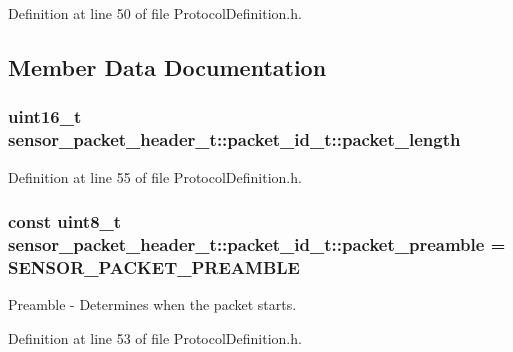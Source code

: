 \-Definition at line 50 of file \-Protocol\-Definition.\-h.



\subsection{\-Member \-Data \-Documentation}
\hypertarget{structsensor__packet__header__t_1_1packet__id__t_a3ece38a344ef1b83c673d7e2e0b83f6f}{
\subsubsection[{packet\-\_\-length}]{\setlength{\rightskip}{0pt plus 5cm}uint16\-\_\-t {\bf sensor\-\_\-packet\-\_\-header\-\_\-t\-::packet\-\_\-id\-\_\-t\-::packet\-\_\-length}}}\label{structsensor__packet__header__t_1_1packet__id__t_a3ece38a344ef1b83c673d7e2e0b83f6f}


\-Definition at line 55 of file \-Protocol\-Definition.\-h.

\hypertarget{structsensor__packet__header__t_1_1packet__id__t_acf0b5180e1e77ceb3817aa7d2a56af01}{
\subsubsection[{packet\-\_\-preamble}]{\setlength{\rightskip}{0pt plus 5cm}const uint8\-\_\-t {\bf sensor\-\_\-packet\-\_\-header\-\_\-t\-::packet\-\_\-id\-\_\-t\-::packet\-\_\-preamble} = {\bf \-S\-E\-N\-S\-O\-R\-\_\-\-P\-A\-C\-K\-E\-T\-\_\-\-P\-R\-E\-A\-M\-B\-L\-E}}}\label{structsensor__packet__header__t_1_1packet__id__t_acf0b5180e1e77ceb3817aa7d2a56af01}


\-Preamble -\/ \-Determines when the packet starts. 



\-Definition at line 53 of file \-Protocol\-Definition.\-h.

